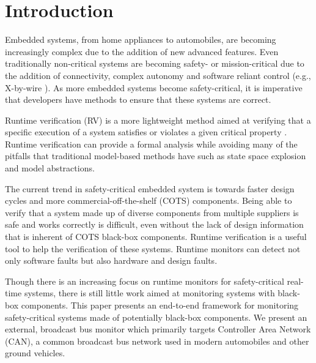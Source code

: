 
\section{Introduction}
Embedded systems, from home appliances to automobiles, are becoming increasingly complex due to the addition of new advanced features. 
Even traditionally non-critical systems are becoming safety- or mission-critical due to the addition of connectivity, complex autonomy and software reliant control (e.g., X-by-wire \cite{Leen2002}).
%
As more embedded systems become safety-critical, it is imperative that developers have methods to ensure that these systems are correct. 

Runtime verification (RV) is a more lightweight method aimed at verifying that a specific execution of a system satisfies or violates a given critical property \cite{Leucker2009}. 
%
Runtime verification can provide a formal analysis while avoiding many of the pitfalls that traditional model-based methods have such as state space explosion and model abstractions. 

The current trend in safety-critical embedded system is towards faster design cycles and more commercial-off-the-shelf (COTS) components. Being able to verify that a system made up of diverse components from multiple suppliers is safe and works correctly is difficult, even without the lack of design information that is inherent of COTS black-box components.
%
Runtime verification is a useful tool to help the verification of these systems. Runtime monitors can detect not only software faults but also hardware and design faults. 

Though there is an increasing focus on runtime monitors for safety-critical real-time systems, there is still little work aimed at monitoring systems with black-box components. This paper presents an end-to-end framework for monitoring safety-critical systems made of potentially black-box components. 
We present an external, broadcast bus monitor which primarily targets Controller Area Network (CAN), a common broadcast bus network used in modern automobiles and other ground vehicles. 

%
% 
%
%

